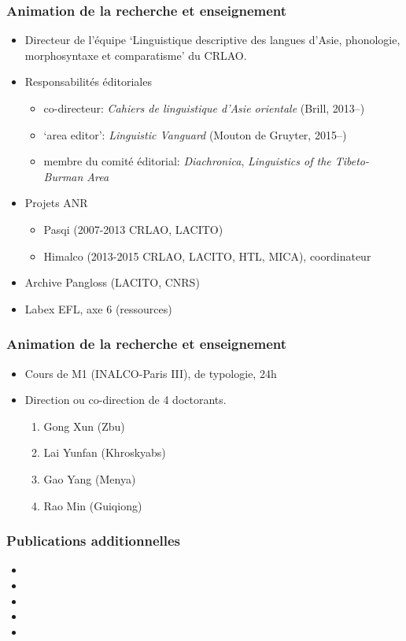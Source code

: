 \documentclass[xcolor=table]{beamer}
\begin{document}
   \begin{frame} 
 \frametitle{Animation de la recherche et enseignement} 
 \begin{itemize}%
 \item  Directeur de l'équipe  `Linguistique descriptive des langues d’Asie, phonologie, morphosyntaxe et comparatisme' du CRLAO.
\item Responsabilités éditoriales
    \begin{itemize}%
\item  co-directeur: \textit{Cahiers de linguistique d'Asie orientale} (Brill, 2013--)
\item  `area editor': \textit{Linguistic Vanguard} (Mouton de Gruyter, 2015--)
\item membre du comité éditorial: \textit{Diachronica}, \textit{Linguistics of the Tibeto-Burman Area}
\end{itemize}
 \item  Projets ANR
  \begin{itemize}%
 \item  Pasqi (2007-2013 CRLAO, LACITO)
  \item Himalco (2013-2015 CRLAO, LACITO, HTL, MICA), coordinateur
\end{itemize}
 \item  Archive Pangloss (LACITO, CNRS)
  \item Labex EFL, axe 6 (ressources)
\end{itemize}
   \end{frame} 

 
\begin{frame} 
\frametitle{Animation de la recherche et enseignement} 
   \begin{itemize}%
\item Cours de M1 (INALCO-Paris III), de typologie, 24h
\item Direction ou co-direction de 4 doctorants.
\begin{enumerate}
\item Gong Xun (Zbu)
\item Lai Yunfan (Khroskyabs)
\item Gao Yang (Menya)
\item Rao Min (Guiqiong)
\end{enumerate}
 \end{itemize}
\end{frame} 
 
 \begin{frame} 
 \frametitle{Publications additionnelles}

   \small
\begin{itemize}
\item  {}  
\item  {}  
\item  {}
\item  {}
\item  {}
\end{itemize}
 \end{frame}
\end{document}
